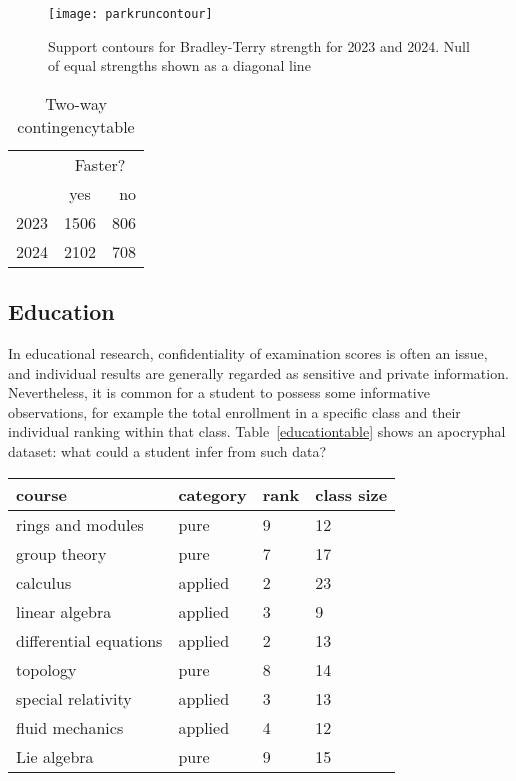 \documentclass[article]{ajs}
\begin{document}
\begin{figure}[t]
  \begin{centering}
\texttt{[image: parkruncontour]} %
\caption{Support contours for Bradley-Terry strength
  for \label{parkruncontour} 2023 and 2024.  Null of equal strengths
  shown as a diagonal line}
\end{centering}
\end{figure}



\begin{table}[h]
    \begin{tabular}{ l c r }
       & \multicolumn{2}{c}{Faster?}\\
       & yes  & no  \\
  2023 & 1506 & 806 \\
  2024 & 2102 & 708
    \end{tabular}
    \caption{Two-way contingency\label{fisherparkrun} table}
\end{table}

\subsection{Education}

In educational research, confidentiality of examination scores is
often an issue, and individual results are generally regarded as
sensitive and private information.  Nevertheless, it is common for a
student to possess some informative observations, for example the
total enrollment in a specific class and their individual ranking
within that class.  Table~\ref{educationtable} shows an apocryphal
dataset: what could a student infer from such data?

\begin{table*}[t]
  \caption{Educational dataset}
\label{educationtable}
\begin{tabular}{llll}
\hline
                   course&category   &rank&class size\\ \hline
      rings and modules  &  pure     & 9  &      12\\
           group theory  &  pure     & 7  &      17\\
               calculus  & applied   & 2  &      23\\
         linear algebra  & applied   & 3  &       9\\
 differential equations  & applied   & 2  &      13\\
               topology  &   pure    & 8  &      14\\
     special relativity  & applied   & 3  &      13\\
        fluid mechanics  & applied   & 4  &      12\\
            Lie algebra  &   pure    & 9  &      15\\
     \hline
\end{tabular}
\end{table*}
\end{document}
